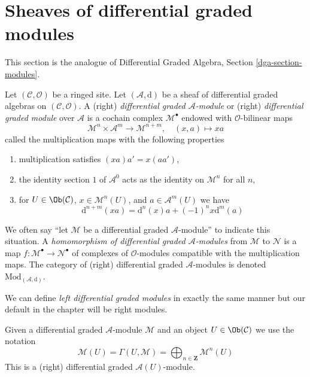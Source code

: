 \section{Sheaves of differential graded modules}
\label{section-modules}

\noindent
This section is the analogue of
Differential Graded Algebra, Section \ref{dga-section-modules}.

\begin{definition}
\label{definition-dgm}
Let $(\mathcal{C}, \mathcal{O})$ be a ringed site.
Let $(\mathcal{A}, \text{d})$ be a sheaf of differential graded algebras
on $(\mathcal{C}, \mathcal{O})$.
A (right) {\it differential graded $\mathcal{A}$-module} or (right)
{\it differential graded module} over $\mathcal{A}$
is a cochain complex $\mathcal{M}^\bullet$ endowed with
$\mathcal{O}$-bilinear maps
$$
\mathcal{M}^n \times \mathcal{A}^m \to \mathcal{M}^{n + m},\quad
(x, a) \longmapsto xa
$$
called the multiplication maps with the following properties
\begin{enumerate}
\item multiplication satisfies $(xa)a' = x(aa')$,
\item the identity section $1$ of $\mathcal{A}^0$
acts as the identity on $\mathcal{M}^n$ for all $n$,
\item for $U \in \Ob(\mathcal{C})$, $x \in \mathcal{M}^n(U)$, and
$a \in \mathcal{A}^m(U)$ we have
$$
\text{d}^{n + m}(xa) = \text{d}^n(x)a + (-1)^n x\text{d}^m(a)
$$
\end{enumerate}
We often say ``let $\mathcal{M}$ be a differential graded
$\mathcal{A}$-module'' to indicate this situation.
A {\it homomorphism of differential graded $\mathcal{A}$-modules}
from $\mathcal{M}$ to $\mathcal{N}$ is a map
$f : \mathcal{M}^\bullet \to \mathcal{N}^\bullet$ of complexes
of $\mathcal{O}$-modules compatible with the multiplication maps.
The category of (right) differential graded $\mathcal{A}$-modules
is denoted $\text{Mod}_{(\mathcal{A}, \text{d})}$.
\end{definition}

\noindent
We can define {\it left differential graded modules} in exactly the same manner
but our default in the chapter will be right modules.

\medskip\noindent
Given a differential graded $\mathcal{A}$-module $\mathcal{M}$
and an object $U \in \Ob(\mathcal{C})$ we use the notation
$$
\mathcal{M}(U) =
\Gamma(U, \mathcal{M}) =
\bigoplus\nolimits_{n \in \mathbf{Z}} \mathcal{M}^n(U)
$$
This is a (right) differential graded $\mathcal{A}(U)$-module.

